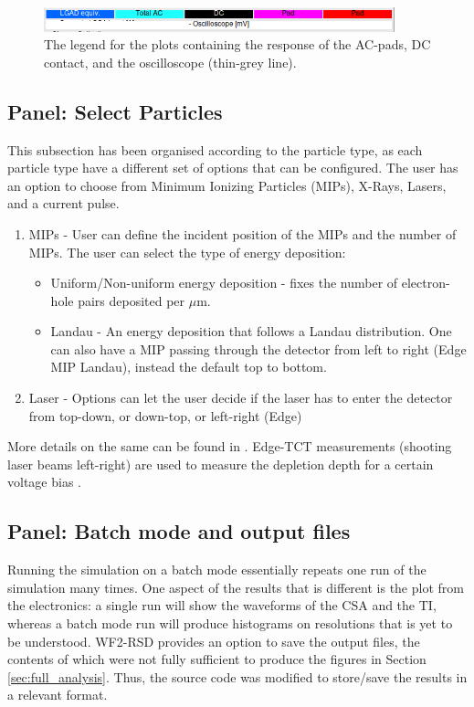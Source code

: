 \documentclass[11pt]{article}
\begin{document}
\begin{figure}[h]
    \centering
    \includegraphics[width=4in]{Images/Legend.png}
    \caption{The legend for the plots containing the response of the AC-pads, DC contact, and the oscilloscope (thin-grey line).}
    \label{fig:wf2-legend}
\end{figure}

\subsection{Panel: Select Particles}
This subsection has been organised according to the particle type, as each particle type have a different set of options that can be configured. The user has an option to choose from Minimum Ionizing Particles (MIPs), X-Rays, Lasers, and a current pulse.
\begin{enumerate}
    \item MIPs - User can define the incident position of the MIPs and the number of MIPs. The user can select the type of energy deposition:
    \begin{itemize}
        \item Uniform/Non-uniform energy deposition - fixes the number of electron-hole pairs deposited per $\mu$m.
        \item Landau - An energy deposition that follows a Landau distribution. One can also have a MIP passing through the detector from left to right (Edge MIP Landau), instead the default top to bottom.
    \end{itemize}
    \item Laser - Options can let the user decide if the laser has to enter the detector from top-down, or down-top, or left-right (Edge)
\end{enumerate}
More details on the same can be found in \cite{WF2-incident-particles-cenna}.
\newline
Edge-TCT measurements (shooting laser beams left-right) are used to measure the depletion depth for a certain voltage bias \cite{moll-acceptor-removal}.

\subsection{Panel: Batch mode and output files}
Running the simulation on a batch mode essentially repeats one run of the simulation many times. One aspect of the results that is different is the plot from the electronics: a single run will show the waveforms of the CSA and the TI, whereas a batch mode run will produce histograms on resolutions that is yet to be understood.
\newline
WF2-RSD provides an option to save the output files, the contents of which were not fully sufficient to produce the figures in Section \ref{sec:full_analysis}. Thus, the source code was modified to store/save the results in a relevant format.
\end{document}
